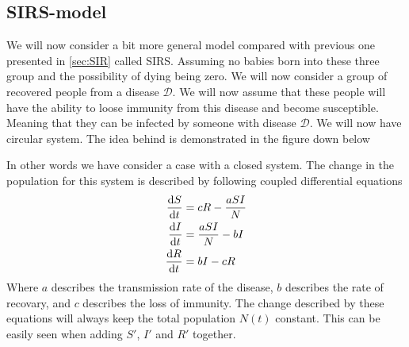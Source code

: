 \documentclass[a4paper, 10pt]{article}
\begin{document}
\subsection{SIRS-model}\label{SIRS model}
We will now consider a bit more general model compared with previous one presented in \eqref{sec:SIR} called SIRS.
Assuming no babies born into these three group and the possibility of dying being zero.
We will now consider a group of recovered people from a disease $\mathcal{D}$. We will now assume that these
people will have the ability to loose immunity from this disease and become susceptible. Meaning that they can
be infected by someone with disease $\mathcal{D}$.
We will now have circular system. The idea behind is demonstrated in the figure down below
\begin{center}
\end{center}
In other words we have consider a case with a closed system. The change in the population for this system is described by following
coupled differential equations
\begin{align}
  \dv{S}{t} &= cR - \frac{aSI}{N} \\
  \dv{I}{t} &= \frac{aSI}{N} - bI \\
  \dv{R}{t} &= bI - cR
  \label{sirs}
\end{align}
Where $a$ describes the transmission rate of the disease, $b$ describes the rate of recovary, and $c$
describes the loss of immunity. The change described by these equations will always keep the
total population $N(t)$ constant. This can be easily seen when adding $S'$, $I'$ and $R'$ together.
\end{document}
